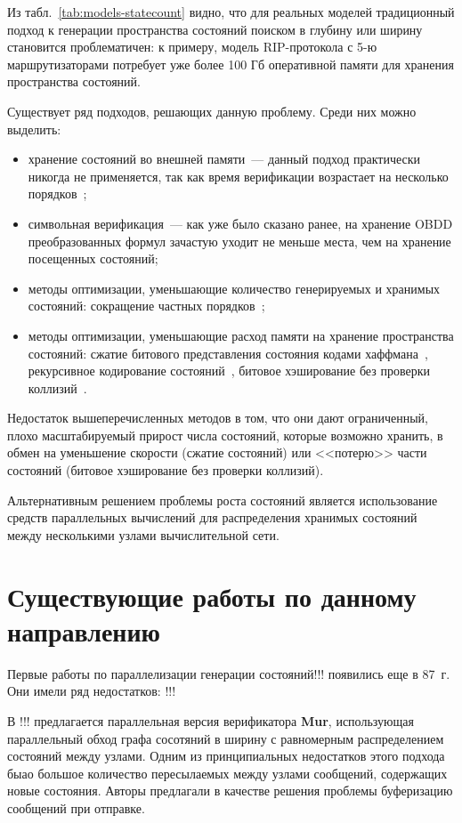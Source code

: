 \documentclass[a4paper,notitlepage,14pt]{article}
\begin{document}
Из табл.~\ref{tab:models-statecount} видно, что для реальных моделей традиционный подход к
генерации пространства состояний поиском в глубину или ширину становится проблематичен: к
примеру, модель RIP-протокола с 5-ю маршрутизаторами потребует уже более 100 Гб
оперативной памяти для хранения пространства состояний.

Существует ряд подходов, решающих данную проблему. Среди них можно выделить:

\begin{itemize}
\item хранение состояний во внешней памяти~--- данный подход практически никогда не
  применяется, так как время верификации возрастает на несколько порядков~\cite{Clarke};
\item символьная верификация~--- как уже было сказано ранее, на хранение OBDD
  преобразованных формул зачастую уходит не меньше места, чем на хранение посещенных
  состояний;
\item методы оптимизации, уменьшающие количество генерируемых и хранимых состояний:
  сокращение частных порядков~\cite{POD};
\item методы оптимизации, уменьшающие расход памяти на хранение пространства состояний:
  сжатие битового представления состояния кодами хаффмана~\cite{StateCompr}, рекурсивное
  кодирование состояний~\cite{StateCompr}, битовое хэширование без проверки
  коллизий~\cite{BitHash1,Wolper}.
\end{itemize}

Недостаток вышеперечисленных методов в том, что они дают ограниченный, плохо
масштабируемый прирост числа состояний, которые возможно хранить, в обмен на уменьшение
скорости (сжатие состояний) или <<потерю>> части состояний (битовое хэширование без
проверки коллизий).

Альтернативным решением проблемы роста состояний является использование средств
параллельных вычислений для распределения хранимых состояний между несколькими узлами
вычислительной сети.

\section{Существующие работы по данному направлению}
\label{sec:other-work}

Первые работы по параллелизации генерации состояний!!! появились еще в 87~г. Они
имели ряд недостатков: !!!

В !!! предлагается параллельная версия верификатора \textbf{Mur\phi}, использующая
параллельный обход графа сосотяний в ширину с равномерным распределением состояний между
узлами. Одним из принципиальных недостатков этого подхода быао большое количество
пересылаемых между узлами сообщений, содержащих новые состояния. Авторы предлагали в
качестве решения проблемы буферизацию сообщений при отправке.
\end{document}
